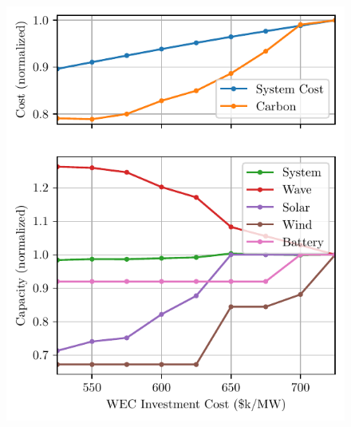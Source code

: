 \documentclass[10pt,twoside]{article}
\newif\ifplaceholder
\let\originalincludegraphics\includegraphics
\renewcommand{\includegraphics}[2][]{%
  \ifplaceholder
    \begin{tikzpicture}
      \node[anchor=south west, inner sep=0] (img) at (0,0) {\originalincludegraphics[#1]{#2}};
      \node at ($(img.south east)!0.5!(img.north west)$)
        [fill=white,opacity=0.8,text=red,font=\huge] {Placeholder};
    \end{tikzpicture}
    \vspace{-\baselineskip}
  \else
    \originalincludegraphics[#1]{#2}%
  \fi
  \placeholderfalse %
}
\begin{document}
\begin{figure}[bth]
\begin{minipage}[b]{0.435\textwidth}
    \includegraphics[width=\linewidth]{figures/CEM_cost_sweep.pdf}
    \label{fig:cem-cost-sweep}
\end{minipage}
\end{figure}
\end{document}
